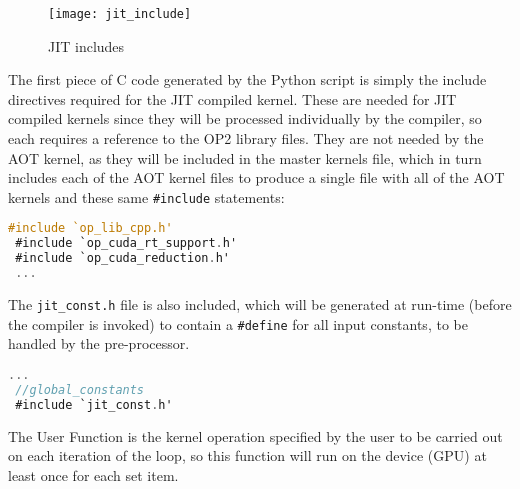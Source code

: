 \clearpage
%
\begin{wrapfigure}[21]{r}{.33\textwidth}
  \centering
  \caption{JIT includes}
  \label{fig:jit_include}
  \texttt{[image: jit\_include]}
\end{wrapfigure}
The first piece of C code generated by the Python script is simply the include directives required for the JIT compiled kernel. These are needed for JIT compiled kernels since they will be processed individually by the compiler, so each requires a reference to the OP2 library files. They are not needed by the AOT kernel, as they will be included in the master kernels file, which in turn includes each of the AOT kernel files to produce a single file with all of the AOT kernels and these same \verb|#include| statements:
\begin{lstlisting}[backgroundcolor = \color{green!20}, language=C]
 #include `op_lib_cpp.h'
 #include `op_cuda_rt_support.h'
 #include `op_cuda_reduction.h'
 ...
\end{lstlisting}
The \verb|jit_const.h| file is also included, which will be generated at run-time (before the compiler is invoked) to contain a \verb|#define| for all input constants, to be handled by the pre-processor.
\begin{lstlisting}[backgroundcolor = \color{green!20}, language=C]
 ...
 //global_constants
 #include `jit_const.h'
\end{lstlisting}

The User Function is the kernel operation specified by the user to be carried out on each iteration of the loop, so this function will run on the device (GPU) at least once for each set item.

